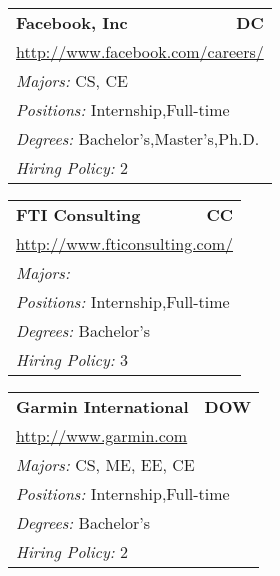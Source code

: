 \documentclass[twoside]{article}
\begin{document}
\begin{center}
\begin{multicols}{3}
\begin{FlushLeft}
\begin{minipage}{\columnwidth}
\end{minipage}
 
\begin{minipage}{\columnwidth}\begin{tabularx}{.95\columnwidth}{Xr}
                 {\Large\bf Facebook, Inc} & {\Large\bf DC}\\
    \multicolumn{2}{p{.95\columnwidth}}{\url{http://www.facebook.com/careers/}}\\
    \multicolumn{2}{p{.95\columnwidth}}{\emph{Majors:} CS, CE}\\
    \multicolumn{2}{p{.95\columnwidth}}{\emph{Positions:} Internship,Full-time}\\
    \multicolumn{2}{p{.95\columnwidth}}{\emph{Degrees:} Bachelor's,Master's,Ph.D.}\\
    \multicolumn{2}{p{.95\columnwidth}}{\emph{Hiring Policy:} 2}\\
    \end{tabularx}
    
\end{minipage}
 
\begin{minipage}{\columnwidth}\begin{tabularx}{.95\columnwidth}{Xr}
                 {\Large\bf FTI Consulting} & {\Large\bf CC}\\
    \multicolumn{2}{p{.95\columnwidth}}{\url{http://www.fticonsulting.com/}}\\
    \multicolumn{2}{p{.95\columnwidth}}{\emph{Majors:} }\\
    \multicolumn{2}{p{.95\columnwidth}}{\emph{Positions:} Internship,Full-time}\\
    \multicolumn{2}{p{.95\columnwidth}}{\emph{Degrees:} Bachelor's}\\
    \multicolumn{2}{p{.95\columnwidth}}{\emph{Hiring Policy:} 3}\\
    \end{tabularx}
    
\end{minipage}
 
\begin{minipage}{\columnwidth}\begin{tabularx}{.95\columnwidth}{Xr}
                 {\Large\bf Garmin International} & {\Large\bf DOW}\\
    \multicolumn{2}{p{.95\columnwidth}}{\url{http://www.garmin.com}}\\
    \multicolumn{2}{p{.95\columnwidth}}{\emph{Majors:} CS, ME, EE, CE}\\
    \multicolumn{2}{p{.95\columnwidth}}{\emph{Positions:} Internship,Full-time}\\
    \multicolumn{2}{p{.95\columnwidth}}{\emph{Degrees:} Bachelor's}\\
    \multicolumn{2}{p{.95\columnwidth}}{\emph{Hiring Policy:} 2}\\
    \end{tabularx}
    

\end{minipage}
\end{FlushLeft}
\end{multicols}
\end{center}
\end{document}
